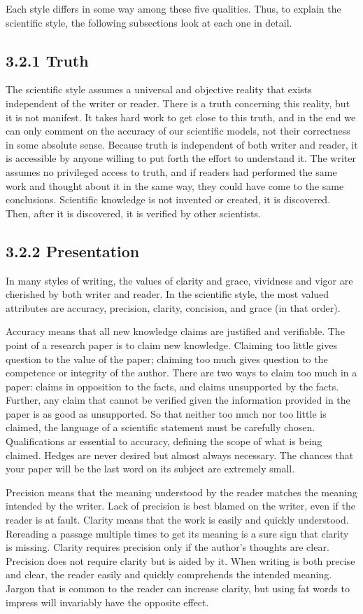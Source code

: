 Each style differs in some way among these five qualities. Thus, to explain the scientific style, the following subsections look at each one in detail.

\subsection*{3.2.1 Truth}
The scientific style assumes a universal and objective reality that exists independent of the writer or reader. There is a truth concerning this reality, but it is not manifest. It takes hard work to get close to this truth, and in the end we can only comment on the accuracy of our scientific models, not their correctness in some absolute sense. Because truth is independent of both writer and reader, it is accessible by anyone willing to put forth the effort to understand it. The writer assumes no privileged access to truth, and if readers had performed the same work and thought about it in the same way, they could have come to the same conclusions. Scientific knowledge is not invented or created, it is discovered. Then, after it is discovered, it is verified by other scientists.

\subsection*{3.2.2 Presentation}
In many styles of writing, the values of clarity and grace, vividness and vigor are cherished by both writer and reader. In the scientific style, the most valued attributes are accuracy, precision, clarity, concision, and grace (in that order).

Accuracy means that all new knowledge claims are justified and verifiable. The point of a research paper is to claim new knowledge. Claiming too little gives question to the value of the paper; claiming too much gives question to the competence or integrity of the author. There are two ways to claim too much in a paper: claims in opposition to the facts, and claims unsupported by the facts. Further, any claim that cannot be verified given the information provided in the paper is as good as unsupported. So that neither too much nor too little is claimed, the language of a scientific statement must be carefully chosen. Qualifications ar essential to accuracy, defining the scope of what is being claimed. Hedges are never desired but almost always necessary. The chances that your paper will be the last word on its subject are extremely small.

Precision means that the meaning understood by the reader matches the meaning intended by the writer. Lack of precision is best blamed on the writer, even if the reader is at fault. Clarity means that the work is easily and quickly understood. Rereading a passage multiple times to get its meaning is a sure sign that clarity is missing. Clarity requires precision only if the author's thoughts are clear. Precision does not require clarity but is aided by it. When writing is both precise and clear, the reader easily and quickly comprehends the intended meaning. Jargon that is common to the reader can increase clarity, but using fat words to impress will invariably have the opposite effect.

